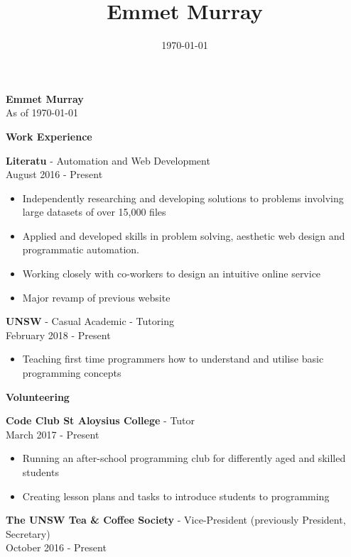 \documentclass{article}
\title{\textbf{Emmet Murray}}
\date{\today}
\newcommand{\minititle}[1]{\begin{center}\textbf{#1} \end{center} \vspace{0.2cm}}
\newcommand{\resumeEntry}[3]{{\large \textbf{#1} - #2} \\ \small{#3}}
\begin{document}
 

\begin{minipage}[t]{0.6\linewidth}   
    \begin{center}
        { \huge \textbf{Emmet Murray}} \\
        \vspace{0.4cm}
        As of \today
    \end{center}
    {
        \minititle{Work Experience}
        \resumeEntry{Literatu}{Automation and Web Development}{August 2016 - Present}
        \begin{itemize}
            \setlength\itemsep{0.05cm}
            \item Independently researching and developing solutions to problems involving large datasets of over 15,000 files
            \item Applied and developed skills in problem solving, aesthetic web design and programmatic automation.
            \item Working closely with co-workers to design an intuitive online service
            \item Major revamp of previous website
        \end{itemize}
        \vspace{0.3cm}
        \resumeEntry{UNSW}{Casual Academic - Tutoring}{February 2018 - Present}
        \begin{itemize}
            \setlength\itemsep{0.05cm}
            \item Teaching first time programmers how to understand and utilise basic programming concepts
        \end{itemize}
    }
    {
        \vspace{0.05cm}
        \minititle{Volunteering}
        \resumeEntry{Code Club St Aloysius College}{Tutor}{March 2017 - Present}
        \begin{itemize}
            \setlength\itemsep{0.05cm}
            \item Running an after-school programming club for differently aged and skilled students
            \item Creating lesson plans and tasks to introduce students to programming
        \end{itemize}
        \vspace{0.4cm}
        \resumeEntry{The UNSW Tea \& Coffee Society}{Vice-President (previously President, Secretary)}{October 2016 - Present}
        \begin{itemize}

\end{itemize}}
\end{minipage}
\end{document}

